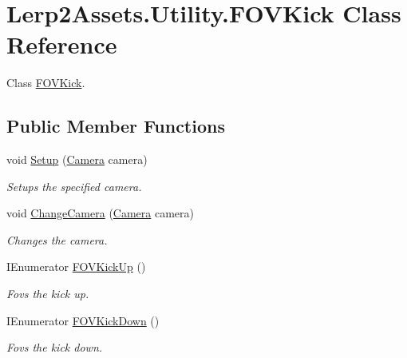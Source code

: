 \hypertarget{class_lerp2_assets_1_1_utility_1_1_f_o_v_kick}{}\section{Lerp2\+Assets.\+Utility.\+F\+O\+V\+Kick Class Reference}
\label{class_lerp2_assets_1_1_utility_1_1_f_o_v_kick}


Class \hyperlink{class_lerp2_assets_1_1_utility_1_1_f_o_v_kick}{F\+O\+V\+Kick}.  


\subsection*{Public Member Functions}
\begin{DoxyCompactItemize}
\item 
void \hyperlink{class_lerp2_assets_1_1_utility_1_1_f_o_v_kick_aa7427ab37d567c86644c94e7121a282f}{Setup} (\hyperlink{class_lerp2_assets_1_1_utility_1_1_f_o_v_kick_a09705b10fb545d218524d96c7d58c8d0}{Camera} camera)
\begin{DoxyCompactList}\small\item\em Setups the specified camera. \end{DoxyCompactList}\item 
void \hyperlink{class_lerp2_assets_1_1_utility_1_1_f_o_v_kick_a7fbcfea0b4c2047a7b68091772cd5635}{Change\+Camera} (\hyperlink{class_lerp2_assets_1_1_utility_1_1_f_o_v_kick_a09705b10fb545d218524d96c7d58c8d0}{Camera} camera)
\begin{DoxyCompactList}\small\item\em Changes the camera. \end{DoxyCompactList}\item 
I\+Enumerator \hyperlink{class_lerp2_assets_1_1_utility_1_1_f_o_v_kick_a0ffe5b52e9b176d85f877cb874b5deab}{F\+O\+V\+Kick\+Up} ()
\begin{DoxyCompactList}\small\item\em Fovs the kick up. \end{DoxyCompactList}\item 
I\+Enumerator \hyperlink{class_lerp2_assets_1_1_utility_1_1_f_o_v_kick_af9f063333ba0ed67544657a515308755}{F\+O\+V\+Kick\+Down} ()
\begin{DoxyCompactList}\small\item\em Fovs the kick down. \end{DoxyCompactList}\end{DoxyCompactItemize}
